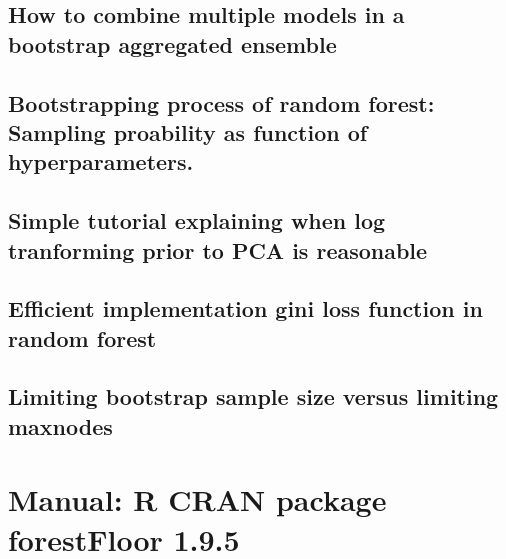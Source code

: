 \subsection{How to combine multiple models in a bootstrap aggregated ensemble}

\label{CV8_combineBagging}

\subsection{Bootstrapping process of random forest: Sampling proability as function of hyperparameters.}

\label{CV9_RFsampling}

\subsection{Simple tutorial explaining when log tranforming prior to PCA is reasonable}

\label{CV10_PCAlogTransform}

\subsection{Efficient implementation gini loss function in random forest}

\label{CV11_RFginigain}

\subsection{Limiting bootstrap sample size versus limiting maxnodes}

\label{CV12_RFsampsize}


\section{Manual: R CRAN package forestFloor 1.9.5}



